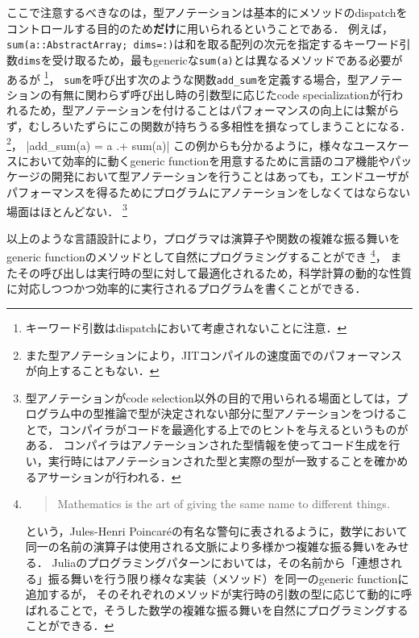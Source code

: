 ここで注意するべきなのは，型アノテーションは基本的にメソッドのdispatchをコントロールする目的のため\textbf{だけ}に用いられるということである．
例えば，\texttt{sum(a::AbstractArray; dims=:)}は和を取る配列の次元を指定するキーワード引数\texttt{dims}を受け取るため，最もgenericな\texttt{sum(a)}とは異なるメソッドである必要があるが
\footnote{
  キーワード引数はdispatchにおいて考慮されないことに注意．
}，
\texttt{sum}を呼び出す次のような関数\texttt{add\_sum}を定義する場合，型アノテーションの有無に関わらず呼び出し時の引数型に応じたcode specializationが行われるため，型アノテーションを付けることはパフォーマンスの向上には繋がらず，むしろいたずらにこの関数が持ちうる多相性を損なってしまうことになる．
\footnote{
  また型アノテーションにより，JITコンパイルの速度面でのパフォーマンスが向上することもない．
}，
|add_sum(a) = a .+ sum(a)|
この例からも分かるように，様々なユースケースにおいて効率的に動くgeneric functionを用意するために言語のコア機能やパッケージの開発において型アノテーションを行うことはあっても，エンドユーザがパフォーマンスを得るためにプログラムにアノテーションをしなくてはならない場面はほとんどない．
\footnote{
  型アノテーションがcode selection以外の目的で用いられる場面としては，プログラム中の型推論で型が決定されない部分に型アノテーションをつけることで，コンパイラがコードを最適化する上でのヒントを与えるというものがある\cite{type-annotation}．
  コンパイラはアノテーションされた型情報を使ってコード生成を行い，実行時にはアノテーションされた型と実際の型が一致することを確かめるアサーションが行われる．
}

以上のような言語設計により，プログラマは演算子や関数の複雑な振る舞いをgeneric functionのメソッドとして自然にプログラミングすることができ
\footnote{
  \begin{quote}
    Mathematics is the art of giving the same name to different things.
  \end{quote}
  という，Jules-Henri Poincaréの有名な警句に表されるように，数学において同一の名前の演算子は使用される文脈により多様かつ複雑な振る舞いをみせる．
  Juliaのプログラミングパターンにおいては，その名前から「連想される」振る舞いを行う限り様々な実装（メソッド）を同一のgeneric functionに追加するが，
  そのそれぞれのメソッドが実行時の引数の型に応じて動的に呼ばれることで，そうした数学の複雑な振る舞いを自然にプログラミングすることができる．
}，
またその呼び出しは実行時の型に対して最適化されるため，科学計算の動的な性質に対応しつつかつ効率的に実行されるプログラムを書くことができる．

\vspace{1ex}

